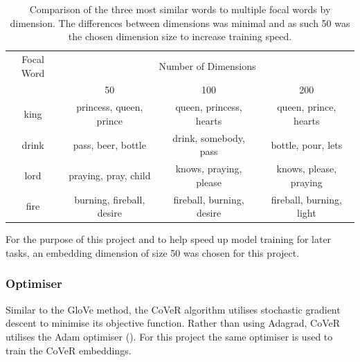\begin{table}[htbp]
	\label{Tab:testembeddingdim}
	\begin{center}
		\begin{tabular}{|c|c|c|c|}
			\hline
			{Focal Word}& \multicolumn{3}{p{5cm}|}{\centering Number of Dimensions} \\
			\cline{2-4} & \multicolumn{1}{c|}{50} & \multicolumn{1}{c|}{100} & \multicolumn{1}{c|}{200} \\ \hline
			king & princess, queen, prince & queen, princess, hearts & queen, prince, hearts \\
			drink & pass, beer, bottle & drink, somebody, pass & bottle, pour, lets \\
			lord & praying, pray, child & knows, praying, please & knows, please, praying \\
			fire & burning, fireball, desire & fireball, burning, desire & fireball, burning, light \\
			\hline
		\end{tabular}
	\end{center}
	\caption[Word Similarity by Dimension]{Comparison of the three most similar words to multiple focal words by dimension. The differences between dimensions was minimal and as such 50 was the chosen dimension size to increase training speed.}
\end{table} 

\noindent
For the purpose of this project and to help speed up model training  for later tasks, an embedding dimension of size 50 was chosen for this project.
\subsubsection{Optimiser}
Similar to the GloVe method, the CoVeR algorithm utilises stochastic gradient descent to minimise its objective function. Rather than using Adagrad, CoVeR utilises the Adam optimiser (\cite{Kingma2014}). For this project the same optimiser is used to train the CoVeR embeddings.
